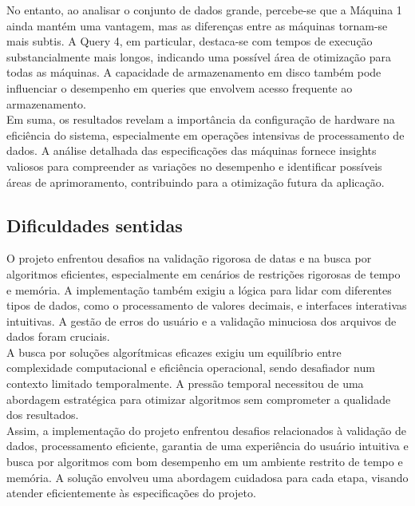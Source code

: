 \documentclass[12pt,a4paper]{article}
\begin{document}
    No entanto, ao analisar o conjunto de dados grande, percebe-se que a Máquina 1 ainda mantém uma vantagem, mas as diferenças entre as máquinas tornam-se mais subtis. A Query 4, em particular, destaca-se com tempos de execução substancialmente mais longos, indicando uma possível área de otimização para todas as máquinas. A capacidade de armazenamento em disco também pode influenciar o desempenho em queries que envolvem acesso frequente ao armazenamento.\\

    Em suma, os resultados revelam a importância da configuração de hardware na eficiência do sistema, especialmente em operações intensivas de processamento de dados. A análise detalhada das especificações das máquinas fornece insights valiosos para compreender as variações no desempenho e identificar possíveis áreas de aprimoramento, contribuindo para a otimização futura da aplicação.
        
    \subsection{Dificuldades sentidas}      
    \hspace{0,6cm}O projeto enfrentou desafios na validação rigorosa de datas e na busca por algoritmos eficientes, especialmente em cenários de restrições rigorosas de tempo e memória. A implementação também exigiu a lógica para lidar com diferentes tipos de dados, como o processamento de valores decimais, e interfaces interativas intuitivas. A gestão de erros do usuário e a validação minuciosa dos arquivos de dados foram cruciais.\\

    A busca por soluções algorítmicas eficazes exigiu um equilíbrio entre complexidade computacional e eficiência operacional, sendo desafiador num contexto limitado temporalmente. A pressão temporal necessitou de uma abordagem estratégica para otimizar algoritmos sem comprometer a qualidade dos resultados.\\

    Assim, a implementação do projeto enfrentou desafios relacionados à validação de dados, processamento eficiente, garantia de uma experiência do usuário intuitiva e busca por algoritmos com bom desempenho em um ambiente restrito de tempo e memória. A solução envolveu uma abordagem cuidadosa para cada etapa, visando atender eficientemente às especificações do projeto.
        
\end{document}
